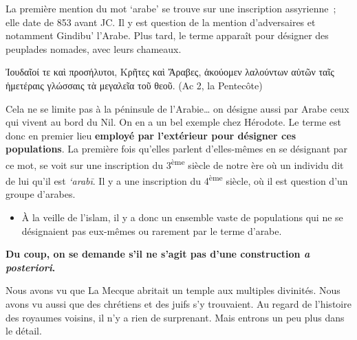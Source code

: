 La première mention du mot `arabe' se trouve sur une inscription
assyrienne~; elle date de 853 avant JC. Il y est question de la mention
d'adversaires et notamment Gindibu' l'Arabe. Plus tard, le terme
apparaît pour désigner des peuplades nomades, avec leurs chameaux.

\foreignlanguage{greek}{
Ἰουδαῖοί τε καὶ προσήλυτοι, Κρῆτες καὶ Ἄραβες, ἀκούομεν
λαλούντων αὐτῶν ταῖς ἡμετέραις γλώσσαις τὰ μεγαλεῖα τοῦ θεοῦ.} (Ac 2, la
Pentecôte)



Cela ne se limite pas à la péninsule de l'Arabie\ldots{} on désigne
aussi par Arabe ceux qui vivent au bord du Nil. On en a un bel exemple
chez Hérodote. Le terme est donc en premier lieu \textbf{employé par
l'extérieur pour désigner ces populations}. La première fois qu'elles
parlent d'elles-mêmes en se désignant par ce mot, se voit sur une
inscription du 3\textsuperscript{ème} siècle de notre ère où un individu
dit de lui qu'il est \emph{`arabī}. Il y a une inscription du
4\textsuperscript{ème} siècle, où il est question d'un groupe d'arabes.

\begin{itemize}
\item
  À la veille de l'islam, il y a donc un ensemble vaste de populations
  qui ne se désignaient pas eux-mêmes ou rarement par le terme d'arabe.
\end{itemize}

\textbf{Du coup, on se demande s'il ne s'agit pas d'une construction
\emph{a posteriori}.}


Nous avons vu que La Mecque abritait un temple aux multiples divinités.
Nous avons vu aussi que des chrétiens et des juifs s'y trouvaient. Au
regard de l'histoire des royaumes voisins, il n'y a rien de surprenant.
Mais entrons un peu plus dans le détail.


